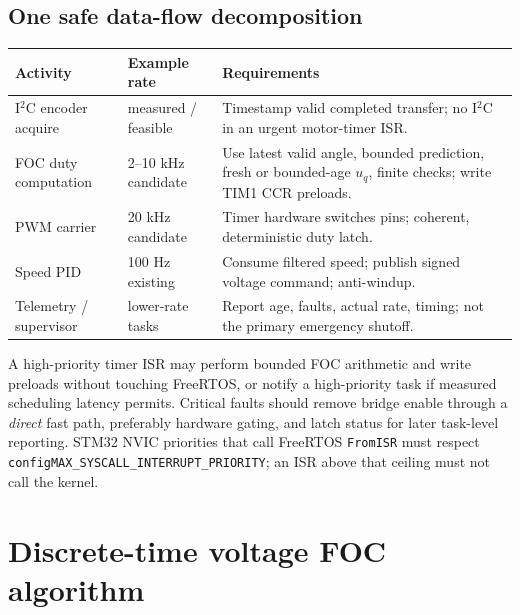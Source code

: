 \documentclass[10pt,letterpaper]{article}
\begin{document}
\subsection{One safe data-flow decomposition}
\begin{center}
\begin{tabularx}{\linewidth}{@{}p{24mm}p{26mm}X@{}}\toprule
Activity & Example rate & Requirements\\\midrule
I$^2$C encoder acquire & measured / feasible & Timestamp valid completed transfer; no I$^2$C in an urgent motor-timer ISR.\\
FOC duty computation & 2--10 kHz candidate & Use latest valid angle, bounded prediction, fresh or bounded-age $u_q$, finite checks; write TIM1 CCR preloads.\\
PWM carrier & 20 kHz candidate & Timer hardware switches pins; coherent, deterministic duty latch.\\
Speed PID & 100 Hz existing & Consume filtered speed; publish signed voltage command; anti-windup.\\
Telemetry / supervisor & lower-rate tasks & Report age, faults, actual rate, timing; not the primary emergency shutoff.\\\bottomrule
\end{tabularx}
\end{center}
A high-priority timer ISR may perform bounded FOC arithmetic and write preloads without touching FreeRTOS, or notify a high-priority task if measured scheduling latency permits. Critical faults should remove bridge enable through a \emph{direct} fast path, preferably hardware gating, and latch status for later task-level reporting. STM32 NVIC priorities that call FreeRTOS \texttt{FromISR} must respect \texttt{configMAX\_SYSCALL\_INTERRUPT\_PRIORITY}; an ISR above that ceiling must not call the kernel.

\section{Discrete-time voltage FOC algorithm}
\end{document}
